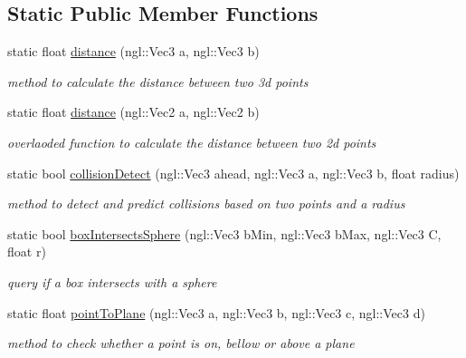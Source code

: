 \subsection*{Static Public Member Functions}
\begin{DoxyCompactItemize}
\item 
static float \hyperlink{classBoidMath_a85211e5039504d81a63ce05bfba4ba87}{distance} (ngl::Vec3 a, ngl::Vec3 b)
\begin{DoxyCompactList}\small\item\em method to calculate the distance between two 3d points \item\end{DoxyCompactList}\item 
static float \hyperlink{classBoidMath_aa3410e24db5ea38c42b509e130810a52}{distance} (ngl::Vec2 a, ngl::Vec2 b)
\begin{DoxyCompactList}\small\item\em overlaoded function to calculate the distance between two 2d points \item\end{DoxyCompactList}\item 
static bool \hyperlink{classBoidMath_a4480da5f7efbf66fa658b82ba3258545}{collisionDetect} (ngl::Vec3 ahead, ngl::Vec3 a, ngl::Vec3 b, float radius)
\begin{DoxyCompactList}\small\item\em method to detect and predict collisions based on two points and a radius \item\end{DoxyCompactList}\item 
static bool \hyperlink{classBoidMath_a1be18ef4f6d12c58cc4168ad0d814a28}{boxIntersectsSphere} (ngl::Vec3 bMin, ngl::Vec3 bMax, ngl::Vec3 C, float r)
\begin{DoxyCompactList}\small\item\em query if a box intersects with a sphere \item\end{DoxyCompactList}\item 
static float \hyperlink{classBoidMath_a088202ca86b463ad5573870bd705cd87}{pointToPlane} (ngl::Vec3 a, ngl::Vec3 b, ngl::Vec3 c, ngl::Vec3 d)
\begin{DoxyCompactList}\small\item\em method to check whether a point is on, bellow or above a plane \item\end{DoxyCompactList}\item 

\end{DoxyCompactItemize}
